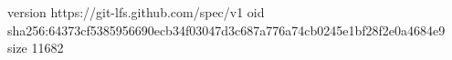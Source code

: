 version https://git-lfs.github.com/spec/v1
oid sha256:64373cf5385956690ecb34f03047d3c687a776a74cb0245e1bf28f2e0a4684e9
size 11682
